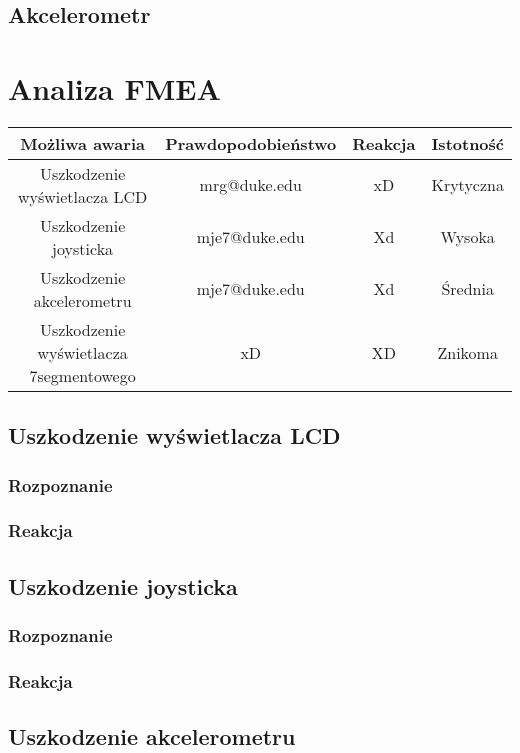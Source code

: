 \documentclass[a4paper,12pt,twoside]{article}
\theoremstyle{plain}
\theoremstyle{definition}
\theoremstyle{remark}
\begin{document}
\subsection{Akcelerometr}



\section{Analiza FMEA}

\begin{center}
	\begin{tabular}{|c|c|c|c|}\hline
		Możliwa awaria & Prawdopodobieństwo & Reakcja & Istotność\\ \hline\hline %
		Uszkodzenie wyświetlacza LCD & mrg@duke.edu& xD & Krytyczna \\ \hline
		Uszkodzenie joysticka & mje7@duke.edu &Xd & Wysoka \\ \hline
		Uszkodzenie akcelerometru & mje7@duke.edu &Xd & \'Srednia \\ \hline
		Uszkodzenie wyświetlacza 7segmentowego & xD &XD & Znikoma \\ \hline
	\end{tabular}
\end{center}
	\subsection{Uszkodzenie wyświetlacza LCD}
		\subsubsection{Rozpoznanie}
		\subsubsection{Reakcja}
	\subsection{Uszkodzenie joysticka}
		\subsubsection{Rozpoznanie}
		\subsubsection{Reakcja}
	\subsection{Uszkodzenie akcelerometru}
\end{document}
